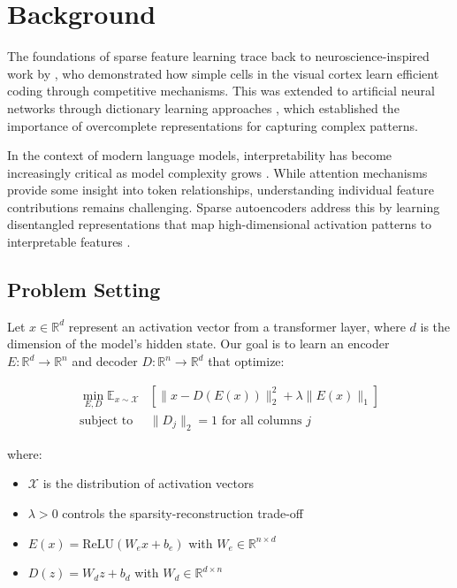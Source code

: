 \documentclass{article} %
\begin{document}
\section{Background}
\label{sec:background}

The foundations of sparse feature learning trace back to neuroscience-inspired work by \cite{Olshausen1996EmergenceOS}, who demonstrated how simple cells in the visual cortex learn efficient coding through competitive mechanisms. This was extended to artificial neural networks through dictionary learning approaches \cite{Kreutz-Delgado2003DictionaryLA}, which established the importance of overcomplete representations for capturing complex patterns.

In the context of modern language models, interpretability has become increasingly critical as model complexity grows \cite{vaswani2017attention}. While attention mechanisms provide some insight into token relationships, understanding individual feature contributions remains challenging. Sparse autoencoders address this by learning disentangled representations that map high-dimensional activation patterns to interpretable features \cite{Vincent2008ExtractingAC}.

\subsection{Problem Setting}
Let $x \in \mathbb{R}^d$ represent an activation vector from a transformer layer, where $d$ is the dimension of the model's hidden state. Our goal is to learn an encoder $E: \mathbb{R}^d \rightarrow \mathbb{R}^n$ and decoder $D: \mathbb{R}^n \rightarrow \mathbb{R}^d$ that optimize:

\begin{align}
    \min_{E,D} \mathbb{E}_{x \sim \mathcal{X}} &[\|x - D(E(x))\|_2^2 + \lambda\|E(x)\|_1] \label{eq:objective} \\
    \text{subject to } &\|D_j\|_2 = 1 \text{ for all columns } j \nonumber
\end{align}

where:
\begin{itemize}
    \item $\mathcal{X}$ is the distribution of activation vectors
    \item $\lambda > 0$ controls the sparsity-reconstruction trade-off
    \item $E(x) = \text{ReLU}(W_ex + b_e)$ with $W_e \in \mathbb{R}^{n \times d}$
    \item $D(z) = W_dz + b_d$ with $W_d \in \mathbb{R}^{d \times n}$
\end{itemize}
\end{document}
